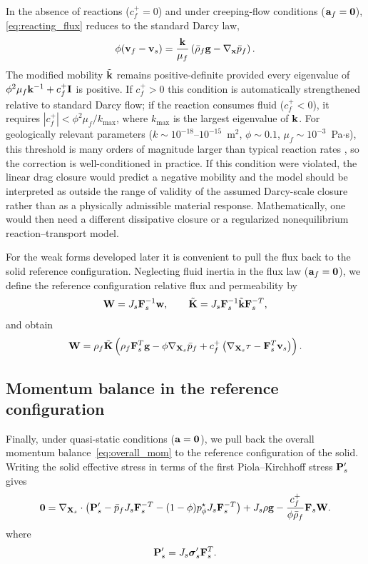 \documentclass[11pt]{article}
\begin{document}
In the absence of reactions ($c_f^+=0$) and under creeping-flow conditions ($\mathbf{a}_f=\mathbf{0}$), \eqref{eq:reacting_flux} reduces to the standard Darcy law,
\[
  \phi(\mathbf{v}_f-\mathbf{v}_s) = \frac{\mathbf{k}}{\mu_f}\left(\bar\rho_f\mathbf{g}-\nabla_{\mathbf{x}}\bar p_f\right).
\]
The modified mobility $\tilde{\mathbf{k}}$ remains positive-definite provided every eigenvalue of $\phi^2\mu_f\mathbf{k}^{-1}+c_f^+\mathbf{I}$ is positive.  If $c_f^+>0$ this condition is automatically strengthened relative to standard Darcy flow; if the reaction consumes fluid ($c_f^+<0$), it requires $|c_f^+|<\phi^2\mu_f/k_{\max}$, where $k_{\max}$ is the largest eigenvalue of $\mathbf{k}$.  For geologically relevant parameters ($k\sim10^{-18}$--$10^{-15}$~m$^2$, $\phi\sim0.1$, $\mu_f\sim10^{-3}$~Pa$\cdot$s), this threshold is many orders of magnitude larger than typical reaction rates \cite{huang2019,cotellucci2024}, so the correction is well-conditioned in practice.  If this condition were violated, the linear drag closure would predict a negative mobility and the model should be interpreted as outside the range of validity of the assumed Darcy-scale closure rather than as a physically admissible material response.  Mathematically, one would then need a different dissipative closure or a regularized nonequilibrium reaction--transport model.

For the weak forms developed later it is convenient to pull the flux back to the solid reference configuration.  Neglecting fluid inertia in the flux law ($\mathbf{a}_f=\mathbf{0}$), we define the reference configuration relative flux and permeability by
\begin{equation}
  \mathbf{W} = J_s\mathbf{F}_s^{-1}\mathbf{w},
  \qquad
  \tilde{\mathbf{K}} = J_s\mathbf{F}_s^{-1}\tilde{\mathbf{k}}\mathbf{F}_s^{-T},
 \label{eq:W material}
\end{equation}
and obtain
\begin{equation}
  \mathbf{W} = \rho_f\tilde{\mathbf{K}}\left(\rho_f\mathbf{F}_s^T\mathbf{g} - \phi\nabla_{\mathbf{X}_s}\bar p_f + c_f^+\left(\nabla_{\mathbf{X}_s}\tau-\mathbf{F}_s^T\mathbf{v}_s\right)\right).
  \label{eq:reacting_flux_ref}
\end{equation}

\subsection{Momentum balance in the reference configuration}
Finally, under quasi-static conditions ($\mathbf{a}=\mathbf{0}$), we pull back the overall momentum balance~\eqref{eq:overall_mom} to the reference configuration of the solid.  Writing the solid effective stress in terms of the first Piola--Kirchhoff stress $\mathbf{P}_s'$ gives
%
\begin{equation}
  \mathbf{0} = \nabla_{\mathbf{X}_s}\cdot\left(\mathbf{P}_s' - \bar p_f J_s\mathbf{F}_s^{-T} - (1-\phi)p_\phi^\star J_s\mathbf{F}_s^{-T}\right) + J_s\rho\mathbf{g} - \frac{c_f^+}{\phi\bar\rho_f}\mathbf{F}_s\mathbf{W}.
  \label{eqn:final_momentum}
\end{equation}
%
where
%
\begin{equation*}
  \mathbf{P}^\prime_s = J_s \boldsymbol{\sigma}^\prime_s \mathbf{F}_s^{T}.
\end{equation*}
%
\end{document}
